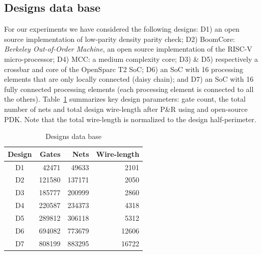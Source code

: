 \documentclass[conference]{IEEEtran}
\begin{document}
\subsection{Designs data base}
For our experiments we have considered the following designs: D1) an open source implementation of low-parity density parity check; D2) BoomCore: \textit{Berkeley Out-of-Order Machine}, an open source implementation of the RISC-V micro-processor; D4) MCC: a medium complexity core; D3) \& D5) respectively a crossbar and core of the OpenSparc T2 SoC;  D6) an SoC with 16 processing elements that are only locally connected (daisy chain); and D7) an SoC with 16 fully connected processing elements (each processing element is connected to all the others). Table~\ref{tab:designs} summarizes key design parameters: gate count, the total number of nets and total design wire-length after P\&R using and open-source PDK. Note that the total wire-length is normalized to the design half-perimeter. 
\begin{table}
\renewcommand{\arraystretch}{1.25}
\caption{Designs data base}
\label{tab:designs}
\centering

\begin{tabular}{||c|r|r|r||}
\hline
Design & Gates  & Nets & Wire-length\\
\hline %
D1              &  42471 &  49633 & 2101\\
\hline %
D2              & 121580 & 137171 & 2050\\
\hline %
D3              & 185777 & 200999 & 2860\\
\hline %
D4              & 220587 & 234373 & 4318 \\
\hline %
D5              & 289812 & 306118 & 5312\\
\hline %
D6              & 694082 & 773679 & 12606\\
\hline %
D7              & 808199 & 883295 & 16722\\
\hline
\end{tabular}
\end{table}
\end{document}
